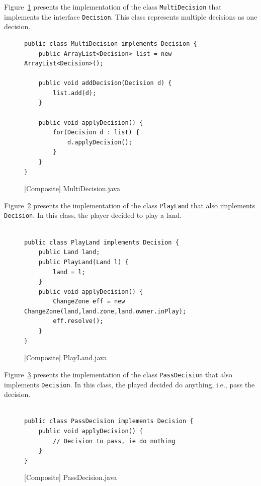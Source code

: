 Figure~\ref{fig:MultiDecision} presents the implementation of the class \texttt{MultiDecision} that implements the interface \texttt{Decision}. This class represents multiple decisions as one decision.

\begin{figure}[!tbp]
\centering
\lstset{language=Java,  basicstyle=\scriptsize, stepnumber=1, showspaces=false, showstringspaces=false,breaklines=true}
\begin{lstlisting}
public class MultiDecision implements Decision {
	public ArrayList<Decision> list = new ArrayList<Decision>();
	
	public void addDecision(Decision d) {
		list.add(d);
	}
 
	public void applyDecision() {
		for(Decision d : list) {
			d.applyDecision();
		}
	}
}
\end{lstlisting}
\caption{[Composite] MultiDecision.java}
\label{fig:MultiDecision}
\end{figure}
\FloatBarrier

Figure~\ref{fig: PlayLand} presents the implementation of the class \texttt{PlayLand} that also implements \texttt{Decision}. In this class, the player decided to play a land.

\begin{figure}[!tbp]
\centering
\lstset{language=Java,  basicstyle=\scriptsize, stepnumber=1, showspaces=false, showstringspaces=false,breaklines=true}
\begin{lstlisting}

public class PlayLand implements Decision {
	public Land land;
	public PlayLand(Land l) {
		land = l;
	}
	public void applyDecision() {
		ChangeZone eff = new ChangeZone(land,land.zone,land.owner.inPlay);
		eff.resolve();
	}
}
\end{lstlisting}
\caption{[Composite] PlayLand.java}
\label{fig: PlayLand}
\end{figure}
\FloatBarrier

Figure~\ref{fig:PassDecision} presents the implementation of the class \texttt{PassDecision} that also implements \texttt{Decision}. In this class, the played decided do anything, i.e., pass the decision.

\begin{figure}[!tbp]
\centering
\lstset{language=Java,  basicstyle=\scriptsize, stepnumber=1, showspaces=false, showstringspaces=false,breaklines=true}
\begin{lstlisting}

public class PassDecision implements Decision {
	public void applyDecision() {
		// Decision to pass, ie do nothing
	}
}

\end{lstlisting}
\caption{[Composite] PassDecision.java}
\label{fig:PassDecision}
\end{figure}
\FloatBarrier

